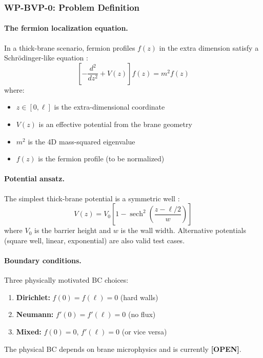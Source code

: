 \subsubsection{WP-BVP-0: Problem Definition}
\label{sec:bvp_definition}

\paragraph{The fermion localization equation.}
In a thick-brane scenario, fermion profiles $f(z)$ in the extra dimension satisfy
a Schr\"odinger-like equation \tagP{}:
\begin{equation}
    \boxed{
    \left[ -\frac{d^2}{dz^2} + V(z) \right] f(z) = m^2 f(z)
    }
    \label{eq:bvp_schrodinger}
\end{equation}
where:
\begin{itemize}[nosep]
    \item $z \in [0, \ell]$ is the extra-dimensional coordinate
    \item $V(z)$ is an effective potential from the brane geometry
    \item $m^2$ is the 4D mass-squared eigenvalue
    \item $f(z)$ is the fermion profile (to be normalized)
\end{itemize}

\paragraph{Potential ansatz.}
The simplest thick-brane potential is a symmetric well \tagP{}:
\begin{equation}
    V(z) = V_0 \left[ 1 - \operatorname{sech}^2\left(\frac{z - \ell/2}{w}\right) \right]
    \label{eq:bvp_potential}
\end{equation}
where $V_0$ is the barrier height and $w$ is the wall width. Alternative potentials
(square well, linear, exponential) are also valid test cases.

\paragraph{Boundary conditions.}
Three physically motivated BC choices:
\begin{enumerate}[nosep]
    \item \textbf{Dirichlet:} $f(0) = f(\ell) = 0$ (hard walls)
    \item \textbf{Neumann:} $f'(0) = f'(\ell) = 0$ (no flux)
    \item \textbf{Mixed:} $f(0) = 0$, $f'(\ell) = 0$ (or vice versa)
\end{enumerate}
The physical BC depends on brane microphysics and is currently \textbf{[OPEN]}.

